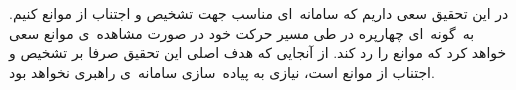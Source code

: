 در این تحقیق سعی داریم که سامانه\ ای مناسب جهت تشخیص و اجتناب از موانع  کنیم. به\ گونه\ ای چهارپره در طی مسیر حرکت خود در صورت مشاهده\ ی موانع سعی خواهد کرد که موانع را رد کند. از آنجایی که هدف اصلی این تحقیق صرفا بر تشخیص و اجتناب از موانع است، نیازی به پیاده\ سازی سامانه\ ی راهبری  نخواهد بود.